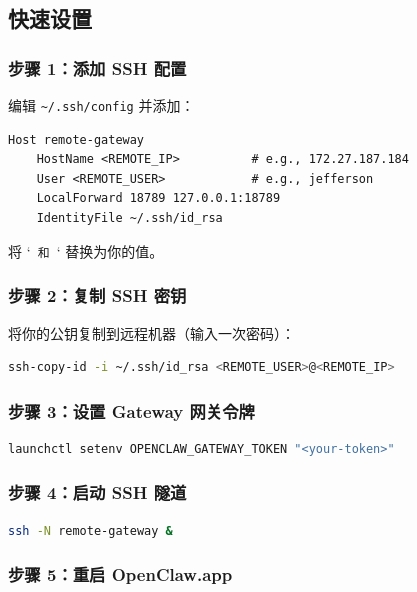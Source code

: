 \subsection{快速设置}


\subsubsection{步骤 1：添加 SSH 配置}


编辑 \texttt{\textasciitilde{}/.ssh/config} 并添加：

\begin{lstlisting}
Host remote-gateway
    HostName <REMOTE_IP>          # e.g., 172.27.187.184
    User <REMOTE_USER>            # e.g., jefferson
    LocalForward 18789 127.0.0.1:18789
    IdentityFile ~/.ssh/id_rsa
\end{lstlisting}


将 `\texttt{ 和 }` 替换为你的值。

\subsubsection{步骤 2：复制 SSH 密钥}


将你的公钥复制到远程机器（输入一次密码）：

\begin{lstlisting}[language=bash]
ssh-copy-id -i ~/.ssh/id_rsa <REMOTE_USER>@<REMOTE_IP>
\end{lstlisting}


\subsubsection{步骤 3：设置 Gateway 网关令牌}


\begin{lstlisting}[language=bash]
launchctl setenv OPENCLAW_GATEWAY_TOKEN "<your-token>"
\end{lstlisting}


\subsubsection{步骤 4：启动 SSH 隧道}


\begin{lstlisting}[language=bash]
ssh -N remote-gateway &
\end{lstlisting}


\subsubsection{步骤 5：重启 OpenClaw.app}


